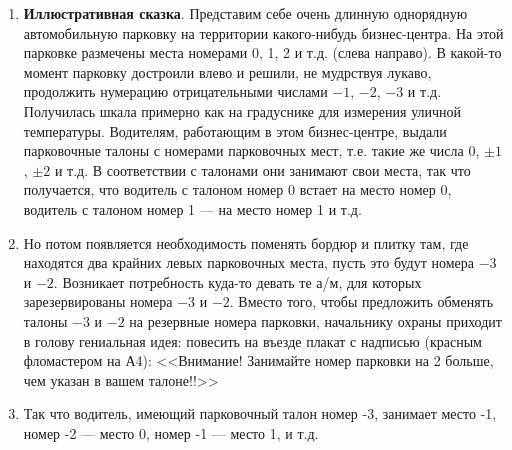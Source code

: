 \begin{enumerate}
\item \textbf{Иллюстративная сказка}. Представим себе очень длинную однорядную автомобильную парковку на территории какого-нибудь бизнес-центра. На этой парковке размечены места номерами 0, 1, 2 и т.д. (слева направо). В какой-то момент парковку достроили влево и решили, не мудрствуя лукаво, продолжить нумерацию отрицательными числами $-1$, $-2$, $-3$ и т.д. Получилась шкала примерно как на градуснике для измерения уличной температуры. Водителям, работающим в этом бизнес-центре, выдали парковочные талоны с номерами парковочных мест, т.е. такие же числа 0, $\pm 1$, $\pm 2$ и т.д. В соответствии с талонами они занимают свои места, так что получается, что водитель с талоном номер 0 встает на место номер 0, водитель с талоном номер 1 --- на место номер 1 и т.д.
\item Но потом появляется необходимость поменять бордюр и плитку там, где находятся два крайних левых парковочных места, пусть это будут номера $-3$ и $-2$. Возникает потребность куда-то девать те а/м, для которых зарезервированы номера $-3$ и $-2$. Вместо того, чтобы предложить обменять талоны $-3$ и $-2$ на резервные номера парковки, начальнику охраны приходит в голову гениальная идея: повесить на въезде плакат с надписью (красным фломастером на А4): <<Внимание! Занимайте номер парковки на 2 больше, чем указан в вашем талоне!!>>
\item Так что водитель, имеющий парковочный талон номер -3, занимает место -1, номер -2 --- место 0, номер -1 --- место 1, и т.д.


\end{enumerate}
